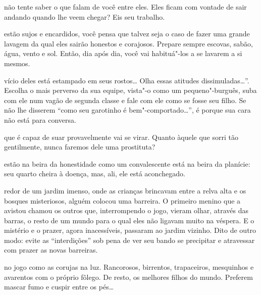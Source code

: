 \bigskip
\bigskip

 não tente saber o que falam de você entre eles. Eles ficam
com vontade de sair andando quando lhe veem chegar? Eis seu trabalho.

\bigskip
\bigskip

 estão sujos e encardidos, você pensa que talvez seja o caso de
fazer uma grande lavagem da qual eles sairão honestos e corajosos.
Prepare sempre escovas, sabão, água, vento e sol. Então, dia após dia,
você vai habituá"-los a se lavarem a si mesmos.

\bigskip
\bigskip

 vício deles está estampado em seus rostos\ldots{} Olha essas atitudes
dissimuladas\ldots{}''. Escolha o mais perverso da sua equipe, vista"-o como
um pequeno"-burguês, suba com ele num vagão de segunda classe e fale com
ele como se fosse seu filho. Se não lhe disserem ``como seu garotinho é
bem"-comportado\ldots{}'', é porque sua cara não está para conversa.

\bigskip
\bigskip

 que é capaz de suar provavelmente vai se virar. Quanto àquele que
sorri tão gentilmente, nunca faremos dele uma prostituta?

\bigskip
\bigskip

 estão na beira da honestidade como um convalescente está na beira
da planície: seu quarto cheira à doença, mas, ali, ele está aconchegado.

\bigskip
\bigskip

\pagebreak

 redor de um jardim imenso, onde as crianças brincavam entre a relva
alta e os bosques misteriosos, alguém colocou uma barreira. O primeiro
menino que a avistou chamou os outros que, interrompendo o jogo, vieram
olhar, através das barras, o resto de um mundo para o qual eles não
ligavam muito na véspera. E o mistério e o prazer, agora inacessíveis,
passaram ao jardim vizinho. Dito de outro modo: evite as ``interdições''
sob pena de ver seu bando se precipitar e atravessar com prazer as novas
barreiras. 

\bigskip
\bigskip

 no jogo como as corujas na luz. Rancorosos, birrentos,
trapaceiros, mesquinhos e avarentos com o próprio fôlego. De resto, os
melhores filhos do mundo. Preferem mascar fumo e cuspir entre os pés\ldots{}

\bigskip
\bigskip


